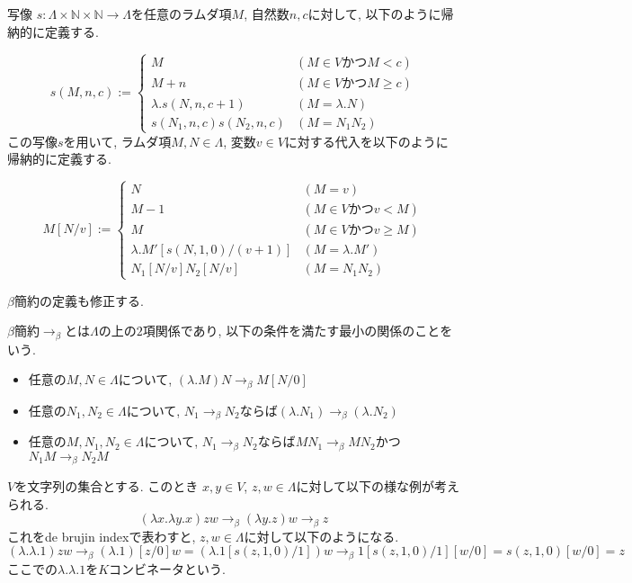 \documentclass{ltjsarticle}
\begin{document}
\begin{defn}
 写像 $s \colon \Lambda \times \mathbb{N} \times \mathbb{N} \rightarrow \Lambda$を任意のラムダ項$M$, 自然数$n, c$に対して, 以下のように帰納的に定義する.
 
\[
  s (M, n, c) := \begin{cases}
    M & (M \in V \text{かつ} M < c) \\
    M + n & (M \in V \text{かつ} M \geq c) \\
    \lambda. s (N, n, c + 1) & (M = \lambda. N) \\
    s (N_1, n, c) s (N_2, n, c) & (M = N_1 N_2)
  \end{cases}
\]
 この写像$s$を用いて, ラムダ項$M, N \in \Lambda$, 変数$v \in V$に対する代入を以下のように帰納的に定義する.
 
\[
 M[N/v] := \begin{cases}
    N & (M = v) \\
    M - 1 & (M \in V \text{かつ} v < M) \\
    M & (M \in V \text{かつ} v \geq M) \\
    \lambda. M' [s (N, 1, 0)/(v + 1)] & (M = \lambda. M') \\
    N_1[N/v] N_2[N/v] & (M = N_1 N_2)
  \end{cases}
\]
\end{defn}

$\beta$簡約の定義も修正する.

\begin{defn}
 $\beta$簡約$\rightarrow_{\beta}$とは$\Lambda$の上の$2$項関係であり, 以下の条件を満たす最小の関係のことをいう.
 \begin{itemize}
  \item 任意の$M, N \in \Lambda$について, $(\lambda. M) N \rightarrow_\beta M[N/0]$
  \item 任意の$N_1, N_2 \in \Lambda$について, $N_1 \rightarrow_\beta N_2$ならば$(\lambda. N_1) \rightarrow_\beta (\lambda. N_2)$
  \item 任意の$M, N_1, N_2 \in \Lambda$について, $N_1 \rightarrow_\beta N_2$ならば$M N_1 \rightarrow_\beta M N_2$かつ$N_1 M \rightarrow_\beta N_2 M$
 \end{itemize}
\end{defn}

\begin{ex}[$K$ コンビネータ]
 $V$を文字列の集合とする. このとき $x, y \in V$, $z, w \in \Lambda$に対して以下の様な例が考えられる.
 \[
 (\lambda x. \lambda y. x) z w \rightarrow_{\beta} (\lambda y. z) w \rightarrow_{\beta} z
 \]
 これをde brujin indexで表わすと, $z, w \in \Lambda$に対して以下のようになる.
 \[
 (\lambda. \lambda. 1) z w \rightarrow_{\beta} (\lambda. 1)[z/0] w = (\lambda. 1[s (z, 1, 0)/1]) w \rightarrow_{\beta} 1[s (z, 1, 0)/1][w/0] = s (z, 1, 0)[w/0] = z
 \]
ここでの$\lambda. \lambda. 1$を$K$コンビネータという.
\end{ex}
\end{document}
